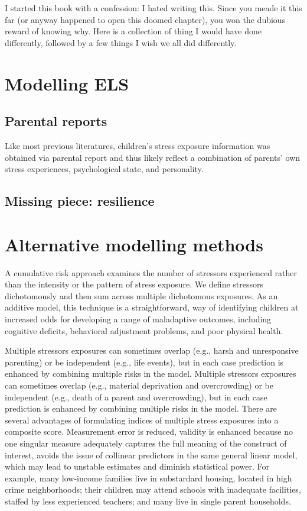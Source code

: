 \documentclass[
  letterpaper,
  DIV=11,
  numbers=noendperiod]{scrreport}
\begin{document}
I started this book with a confession: I hated writing this. Since you
meade it this far (or anyway happened to open this doomed chapter), you
won the dubious reward of knowing why. Here is a collection of thing I
would have done differently, followed by a few things I wish we all did
differently.

\section{Modelling ELS}\label{modelling-els}

\subsection{Parental reports}\label{parental-reports}

Like most previous literatures, children's stress exposure information
was obtained via parental report and thus likely reflect a combination
of parents' own stress experiences, psychological state, and
personality.

\subsection{Missing piece: resilience}\label{missing-piece-resilience}

\section{Alternative modelling
methods}\label{alternative-modelling-methods}

A cumulative risk approach examines the number of stressors experienced
rather than the intensity or the pattern of stress exposure. We define
stressors dichotomously and then sum across multiple dichotomous
exposures. As an additive model, this technique is a straightforward,
way of identifying children at increased odds for developing a range of
maladaptive outcomes, including cognitive deficits, behavioral
adjustment problems, and poor physical health.

Multiple stressors exposures can sometimes overlap (e.g., harsh and
unresponsive parenting) or be independent (e.g., life events), but in
each case prediction is enhanced by combining multiple risks in the
model. Multiple stressors exposures can sometimes overlap (e.g.,
material deprivation and overcrowding) or be independent (e.g., death of
a parent and overcrowding), but in each case prediction is enhanced by
combining multiple risks in the model. There are several advantages of
formulating indices of multiple stress exposures into a composite score.
Measurement error is reduced, validity is enhanced because no one
singular measure adequately captures the full meaning of the construct
of interest, avoids the issue of collinear predictors in the same
general linear model, which may lead to unstable estimates and diminish
statistical power. For example, many low-income families live in
substardard housing, located in high crime neighborhoods; their children
may attend schools with inadequate facilities, staffed by less
experienced teachers; and many live in single parent households.
\end{document}
